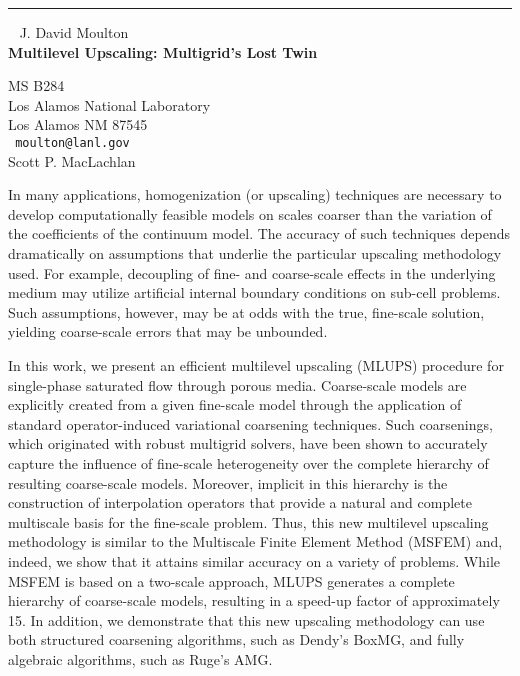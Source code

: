 \documentclass{report}
\begin{document}
\begin{center}

\rule{6in}{1pt} \
{\large
J. David Moulton
\\ {\bf
Multilevel Upscaling: Multigrid's Lost Twin
}}

MS B284 \\
Los Alamos National Laboratory \\
Los Alamos NM 87545
\\ {\tt
moulton@lanl.gov
}
\\
Scott P. MacLachlan
\end{center}

In many applications, homogenization (or upscaling) techniques are
necessary to develop computationally feasible models on scales coarser
than the variation of the coefficients of the continuum model. The
accuracy of such techniques depends dramatically on assumptions that
underlie the particular upscaling methodology used. For example,
decoupling of fine- and coarse-scale effects in the underlying medium
may utilize artificial internal boundary conditions on sub-cell
problems. Such assumptions, however, may be at odds with the true,
fine-scale solution, yielding coarse-scale errors that may be
unbounded.

In this work, we present an efficient multilevel upscaling (MLUPS)
procedure for single-phase saturated flow through porous media.
Coarse-scale models are explicitly created from a given fine-scale
model through the application of standard operator-induced variational
coarsening techniques. Such coarsenings, which originated with robust
multigrid solvers, have been shown to accurately capture the influence
of fine-scale heterogeneity over the complete hierarchy of resulting
coarse-scale models. Moreover, implicit in this hierarchy is the
construction of interpolation operators that provide a natural and
complete multiscale basis for the fine-scale problem. Thus, this new
multilevel upscaling methodology is similar to the Multiscale Finite
Element Method (MSFEM) and, indeed, we show that it attains similar
accuracy on a variety of problems. While MSFEM is based on a two-scale
approach, MLUPS generates a complete hierarchy of coarse-scale models,
resulting in a speed-up factor of approximately 15. In addition, we
demonstrate that this new upscaling methodology can use both structured
coarsening algorithms, such as Dendy's BoxMG, and fully algebraic
algorithms, such as Ruge's AMG.
\end{document}
